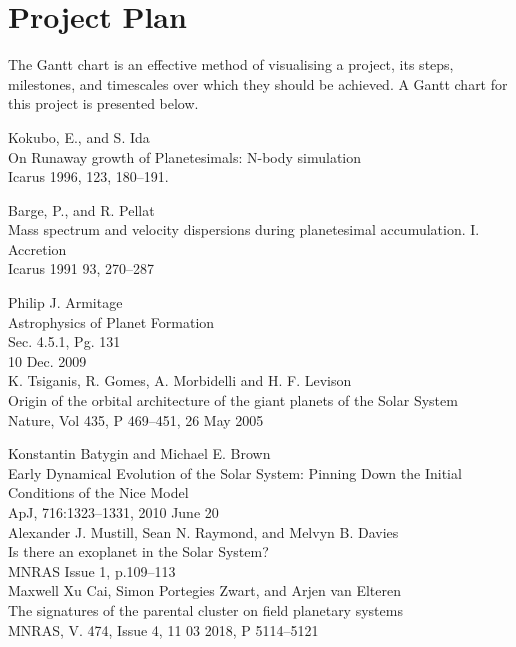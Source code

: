 \documentclass[a4paper,10pt]{article}
\begin{document}
\section{Project Plan}

The Gantt chart is an effective method of visualising a project, its steps, milestones, and timescales over which they should be achieved. A Gantt chart for this project is presented below.




\pagebreak[4]
\begin{thebibliography}{9}

Kokubo, E., and S. Ida\\
On Runaway growth of Planetesimals: N-body simulation\\ 
Icarus 1996, 123, 180--191.

Barge, P., and R. Pellat\\ 
Mass spectrum and velocity dispersions during planetesimal accumulation. I. Accretion\\
Icarus 1991 93, 270--287

Philip J. Armitage\\
Astrophysics of Planet Formation\\
Sec. 4.5.1, Pg. 131\\
10 Dec. 2009\\

K. Tsiganis, R. Gomes, A. Morbidelli and H. F. Levison\\
Origin of the orbital architecture of the giant planets of the Solar System\\ 
Nature, Vol 435, P 469--451, 26 May 2005

Konstantin Batygin and Michael E. Brown\\
Early Dynamical Evolution of the Solar System: Pinning Down the Initial Conditions of the Nice Model\\
 ApJ, 716:1323--1331, 2010 June 20\\

Alexander J. Mustill, Sean N. Raymond, and Melvyn B. Davies\\
Is there an exoplanet in the Solar System?\\
MNRAS Issue 1, p.109--113\\

Maxwell Xu Cai, Simon Portegies Zwart, and Arjen van Elteren\\ 
The signatures of the parental cluster on field planetary systems\\
MNRAS, V. 474, Issue 4, 11 03 2018, P 5114--5121\\


\end{thebibliography}
\end{document}
